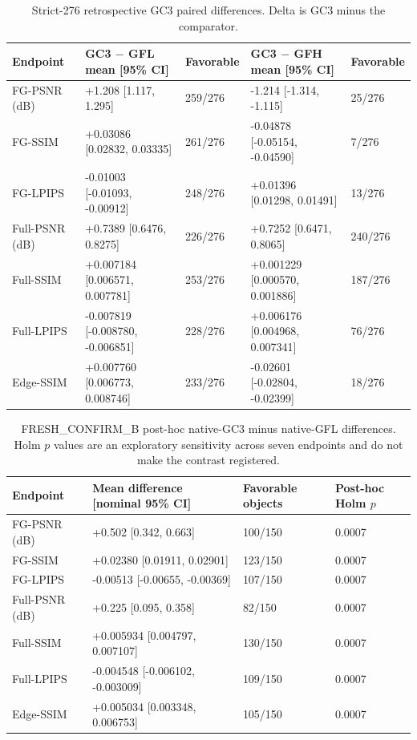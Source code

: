 \documentclass[10pt]{article}
\begin{document}
\begin{table}[p]
\centering\scriptsize
\caption{Strict-276 retrospective GC3 paired differences. Delta is GC3 minus the comparator.}
\label{tab:strict276-c3}
\begin{tabular}{p{1.4cm}p{4.4cm}p{1.3cm}p{4.4cm}p{1.3cm}}
\toprule
Endpoint & GC3 $-$ GFL mean [95\% CI] & Favorable & GC3 $-$ GFH mean [95\% CI] & Favorable \\
\midrule
FG-PSNR (dB) & +1.208 [1.117, 1.295] & 259/276 & -1.214 [-1.314, -1.115] & 25/276 \\
FG-SSIM & +0.03086 [0.02832, 0.03335] & 261/276 & -0.04878 [-0.05154, -0.04590] & 7/276 \\
FG-LPIPS & -0.01003 [-0.01093, -0.00912] & 248/276 & +0.01396 [0.01298, 0.01491] & 13/276 \\
Full-PSNR (dB) & +0.7389 [0.6476, 0.8275] & 226/276 & +0.7252 [0.6471, 0.8065] & 240/276 \\
Full-SSIM & +0.007184 [0.006571, 0.007781] & 253/276 & +0.001229 [0.000570, 0.001886] & 187/276 \\
Full-LPIPS & -0.007819 [-0.008780, -0.006851] & 228/276 & +0.006176 [0.004968, 0.007341] & 76/276 \\
Edge-SSIM & +0.007760 [0.006773, 0.008746] & 233/276 & -0.02601 [-0.02804, -0.02399] & 18/276 \\
\bottomrule
\end{tabular}
\end{table}

\begin{table}[p]
\centering\scriptsize
\caption{FRESH\_CONFIRM\_B post-hoc native-GC3 minus native-GFL differences. Holm $p$ values are an exploratory sensitivity across seven endpoints and do not make the contrast registered.}
\label{tab:freshb-c3}
\begin{tabular}{p{1.8cm}p{5.2cm}p{1.4cm}p{1.4cm}}
\toprule
Endpoint & Mean difference [nominal 95\% CI] & Favorable objects & Post-hoc Holm $p$ \\
\midrule
FG-PSNR (dB) & +0.502 [0.342, 0.663] & 100/150 & 0.0007 \\
FG-SSIM & +0.02380 [0.01911, 0.02901] & 123/150 & 0.0007 \\
FG-LPIPS & -0.00513 [-0.00655, -0.00369] & 107/150 & 0.0007 \\
Full-PSNR (dB) & +0.225 [0.095, 0.358] & 82/150 & 0.0007 \\
Full-SSIM & +0.005934 [0.004797, 0.007107] & 130/150 & 0.0007 \\
Full-LPIPS & -0.004548 [-0.006102, -0.003009] & 109/150 & 0.0007 \\
Edge-SSIM & +0.005034 [0.003348, 0.006753] & 105/150 & 0.0007 \\
\bottomrule
\end{tabular}
\end{table}
\end{document}
